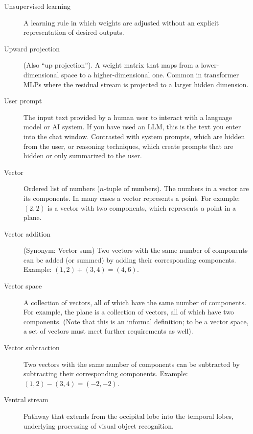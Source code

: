 \begin{description}
\item[Unsupervised learning] A learning rule in which weights are adjusted without an explicit representation of desired outputs.

\item[Upward projection] (Also ``up projection''). A weight matrix that maps from a lower-dimensional space to a higher-dimensional one. Common in transformer MLPs where the residual stream is projected to a larger hidden dimension.

\item[User prompt] The input text provided by a human user to interact with a language model or AI system. If you have used an LLM, this is the text you enter into the chat window. Contrasted with system prompts, which are hidden from the user, or reasoning techniques, which create prompts that are hidden or only summarized to the user.

\item[Vector] Ordered list of numbers ($n$-tuple of numbers). The numbers in a vector are its components. In many cases a vector represents a point. For example: $(2,2)$ is a vector with two components, which represents a point in a plane.

\item[Vector addition] (Synonym: Vector sum) Two vectors with the same number of components can be added (or summed) by adding their corresponding components. Example: $(1,2) + (3,4) = (4,6)$.

\item[Vector space] A collection of vectors, all of which have the same number of components. For example, the plane is a collection of vectors, all of which have two components. (Note that this is an  informal definition; to be a vector space, a set of vectors must meet further requirements as well).

\item[Vector subtraction] Two vectors with the same number of components can be subtracted by subtracting their corresponding components. Example: $(1,2) - (3,4) = (-2,-2)$.


\item[Ventral stream] Pathway that extends from the occipital lobe into the temporal lobes, underlying processing of visual object recognition.


\end{description}
